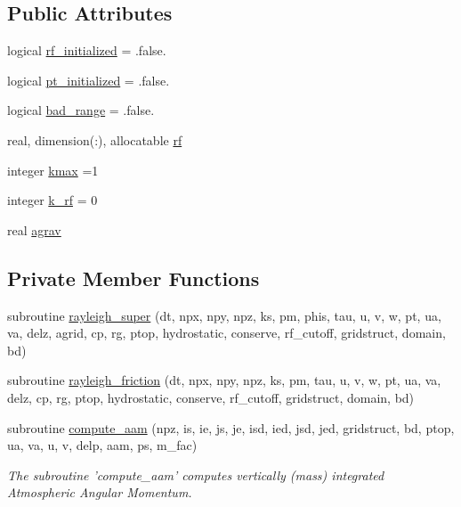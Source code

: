\subsection*{Public Attributes}
\begin{DoxyCompactItemize}
\item 
logical \hyperlink{classfv__dynamics__mod_a93c42e85cca69658841e13e403c3c89a}{rf\-\_\-initialized} = .false.
\item 
logical \hyperlink{classfv__dynamics__mod_a1c473782ffaa6249be5ba2c3d35a59dc}{pt\-\_\-initialized} = .false.
\item 
logical \hyperlink{classfv__dynamics__mod_a286a6106a75bb334c9531e0354298b11}{bad\-\_\-range} = .false.
\item 
real, dimension(\-:), allocatable \hyperlink{classfv__dynamics__mod_a9e9aac45b5404781dcafeff189daf4de}{rf}
\item 
integer \hyperlink{classfv__dynamics__mod_a223d12ae03cc1c109ba5999ef065bb4a}{kmax} =1
\item 
integer \hyperlink{classfv__dynamics__mod_ac064d1ed1892a3588eb7c6f430954753}{k\-\_\-rf} = 0
\item 
real \hyperlink{classfv__dynamics__mod_a4503b9b3f35f05d3a6dc3535ec7017e9}{agrav}
\end{DoxyCompactItemize}
\subsection*{Private Member Functions}
\begin{DoxyCompactItemize}
\item 
subroutine \hyperlink{classfv__dynamics__mod_abde34c9e5a63d32699e152028179657b}{rayleigh\-\_\-super} (dt, npx, npy, npz, ks, pm, phis, tau, u, v, w, pt, ua, va, delz, agrid, cp, rg, ptop, hydrostatic, conserve, rf\-\_\-cutoff, gridstruct, domain, bd)
\item 
subroutine \hyperlink{classfv__dynamics__mod_a143d1c8cb6f535a5567bd0f4ef1f4a4f}{rayleigh\-\_\-friction} (dt, npx, npy, npz, ks, pm, tau, u, v, w, pt, ua, va, delz, cp, rg, ptop, hydrostatic, conserve, rf\-\_\-cutoff, gridstruct, domain, bd)
\item 
subroutine \hyperlink{classfv__dynamics__mod_a2694a8332d9124e2f4332551ffd92795}{compute\-\_\-aam} (npz, is, ie, js, je, isd, ied, jsd, jed, gridstruct, bd, ptop, ua, va, u, v, delp, aam, ps, m\-\_\-fac)
\begin{DoxyCompactList}\small\item\em The subroutine 'compute\-\_\-aam' computes vertically (mass) integrated Atmospheric Angular Momentum. \end{DoxyCompactList}\end{DoxyCompactItemize}


